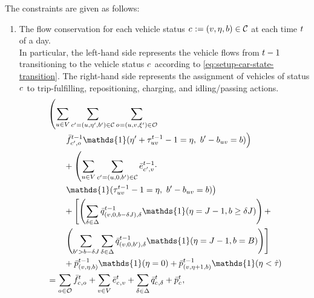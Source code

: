 The constraints are given as follows:
\begin{enumerate}
    \item The flow conservation for each vehicle status $c_{}:= (v, \eta, b) \in \mathcal{C}$ at each time $t$ of a day. \\
    In particular, the left-hand side represents the vehicle flows from $t - 1$ transitioning to the vehicle status $c_{}$ according to \eqref{eq:setup-car-state-transition}. The right-hand side represents the assignment of vehicles of status $c_{}$ to trip-fulfilling, repositioning, charging, and idling/passing actions. 
    \begin{align}
        &\left(\sum_{\origin \in \Region} \sum_{\cartype{}'= (\origin, \timetoarrival', \battery') \in \Cartype} \sum_{ \triptype{}= (\origin, \destination, \xi') \in \Triptype} \right. \notag\\
        &\qquad \left. \lptripfulfill{\cartype{}', \triptype{}}{\time-1}\mathds{1}(\timetoarrival' + \timecost{\origin\destination}{\time-1} - 1 = \timetoarrival, \ \battery' - \batterycost{\origin \destination} = \battery) \right) \notag \\
        &\qquad+ \left(\sum_{\origin \in \Region} \sum_{\cartype{}'= (\origin, 0, \battery') \in \Cartype} \lpreroute{\cartype{}', \destination}{\time-1} \cdot \right. \notag\\
        &\qquad \left. \mathds{1}(\timecost{\origin\destination}{\time-1} - 1 = \timetoarrival, \  \battery' - \batterycost{\origin\destination} = \battery) \right) \notag \\
        &\qquad+ \left[ \left(\sum_{\type \in \Type} \lpcharge{(\destination, 0, \battery - \type \chargetime), \type}{\time-1} \mathds{1}(\timetoarrival = \chargetime - 1, \battery \geq \type \chargetime) \right) + \right. \notag\\
        &\qquad \left. \left(\sum_{\battery' > \battery - \type \chargetime} \sum_{\type \in \Type} \lpcharge{(\destination, 0, \battery'), \type}{\time-1} \mathds{1}(\timetoarrival = \chargetime - 1, \battery = \range) \right) \right] \notag\\
        &\qquad+ \lppass{(\destination, \timetoarrival, \battery)}{\time-1} \mathds{1}(\timetoarrival = 0) + \lppass{(\destination, \timetoarrival+1, \battery)}{\time-1} \mathds{1}(\timetoarrival < \maxtimecost{}) \notag \\
        &= \sum_{\triptype{} \in \Triptype} \lptripfulfill{\cartype{}, \triptype{}}{\time} + \sum_{\destination \in \Region} \lpreroute{\cartype{}, \destination}{\time} + \sum_{\type \in \Type} \lpcharge{\cartype{}, \type}{\time} + \lppass{\cartype{}}{\time},\notag\\ 

\end{align}
\end{enumerate}
